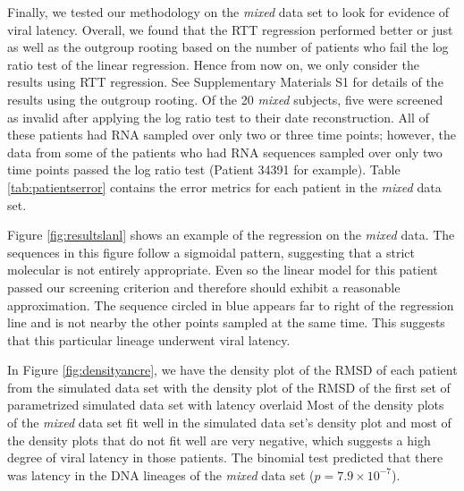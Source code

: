 \documentclass[12pt]{article}
\begin{document}

Finally, we tested our methodology on the {\em mixed} data set to look for evidence of viral latency.
Overall, we found that the RTT regression performed better or just as well as the outgroup rooting based on the number of patients who fail the log ratio test of the linear regression.
Hence from now on, we only consider the results using RTT regression.
See Supplementary Materials S1 for details of the results using the outgroup rooting.
Of the 20 \emph{mixed} subjects, five were screened as invalid after applying the log ratio test to their date reconstruction.
All of these patients had RNA sampled over only two or three time points; however, the data from some of the patients who had RNA sequences sampled over only two time points passed the log ratio test (Patient 34391 for example).
Table \ref{tab:patientserror} contains the error metrics for each patient in the \emph{mixed} data set.

Figure \ref{fig:resultslanl} shows an example of the regression on the \emph{mixed} data.
The sequences in this figure follow a sigmoidal pattern, suggesting that a strict molecular is not entirely appropriate.
Even so the linear model for this patient passed our screening criterion and therefore should exhibit a reasonable approximation.
The sequence circled in blue appears far to right of the regression line and is not nearby the other points sampled at the same time.
This suggests that this particular lineage underwent viral latency.

In Figure \ref{fig:densityancre}, we have the density plot of the RMSD of each patient from the simulated data set with the density plot of the RMSD of the first set of parametrized simulated data set with latency overlaid
Most of the density plots of the \emph{mixed} data set fit well in the simulated data set's density plot and most of the density plots that do not fit well are very negative, which suggests a high degree of viral latency in those patients.
The binomial test predicted that there was latency in the DNA lineages of the \emph{mixed} data set ($p=7.9 \times 10^{-7}$).
\end{document}
